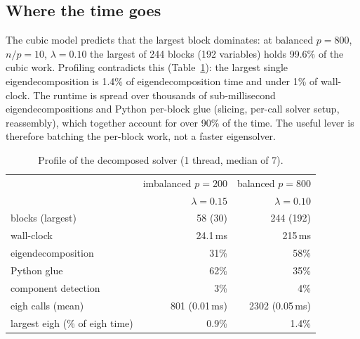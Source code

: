 \documentclass[pdflatex,sn-mathphys-num]{sn-jnl}
\begin{document}
\subsection{Where the time goes}
The cubic model predicts that the largest block dominates: at balanced
$p=800$, $n/p=10$, $\lambda=0.10$ the largest of 244 blocks (192 variables)
holds 99.6\% of the cubic work. Profiling contradicts this
(Table~\ref{tab:profile}): the largest single eigendecomposition is 1.4\% of
eigendecomposition time and under 1\% of wall-clock. The runtime is spread
over thousands of sub-millisecond eigendecompositions and Python per-block
glue (slicing, per-call solver setup, reassembly), which together account
for over 90\% of the time. The useful lever is therefore batching the
per-block work, not a faster eigensolver.
\begin{table}[t]
\centering
\caption{Profile of the decomposed solver (1 thread, median of 7).}
\label{tab:profile}
\begin{tabular}{lrr}
\toprule
& imbalanced $p{=}200$ & balanced $p{=}800$ \\
& $\lambda{=}0.15$ & $\lambda{=}0.10$ \\
\midrule
blocks (largest) & 58 (30) & 244 (192) \\
wall-clock & 24.1\,ms & 215\,ms \\
eigendecomposition & 31\% & 58\% \\
Python glue & 62\% & 35\% \\
component detection & 3\% & 4\% \\
eigh calls (mean) & 801 (0.01\,ms) & 2302 (0.05\,ms) \\
largest eigh (\% of eigh time) & 0.9\% & 1.4\% \\
\bottomrule
\end{tabular}
\end{table}
\end{document}
